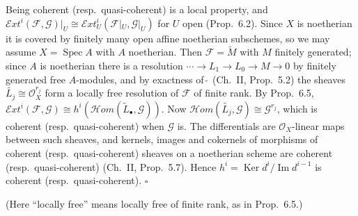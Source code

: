 \documentclass[11pt]{article}
\begin{document}
\pf
Being coherent (resp.\ quasi-coherent) is a local property, and $\mathcal{E}xt^i(\mathcal F,\mathcal G)|_U\cong\mathcal{E}xt^i_U(\mathcal F|_U,\mathcal G|_U)$ for $U$ open (Prop.~6.2). Since $X$ is noetherian it is covered by finitely many open affine noetherian subschemes, so we may assume $X=\operatorname{Spec}A$ with $A$ noetherian. Then $\mathcal F=\widetilde M$ with $M$ finitely generated; since $A$ is noetherian there is a resolution $\cdots\to L_1\to L_0\to M\to0$ by finitely generated free $A$-modules, and by exactness of $\widetilde{\ }$ (Ch.~II, Prop.~5.2) the sheaves $\widetilde{L_j}\cong\mathcal O_X^{r_j}$ form a locally free resolution of $\mathcal F$ of finite rank. By Prop.~6.5, $\mathcal{E}xt^i(\mathcal F,\mathcal G)\cong h^i(\mathcal{H}om(\widetilde{L}_\bullet,\mathcal G))$. Now $\mathcal{H}om(\widetilde{L_j},\mathcal G)\cong\mathcal G^{r_j}$, which is coherent (resp.\ quasi-coherent) when $\mathcal G$ is. The differentials are $\mathcal O_X$-linear maps between such sheaves, and kernels, images and cokernels of morphisms of coherent (resp.\ quasi-coherent) sheaves on a noetherian scheme are coherent (resp.\ quasi-coherent) (Ch.~II, Prop.~5.7). Hence $h^i=\operatorname{Ker}d^i/\operatorname{Im}d^{i-1}$ is coherent (resp.\ quasi-coherent). \hfill$\square$

\pf
(Here ``locally free'' means locally free of finite rank, as in Prop.~6.5.)
\end{document}
